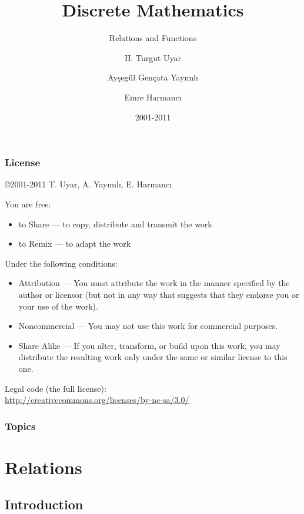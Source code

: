 \documentclass[dvipsnames]{beamer}
\title{Discrete Mathematics}
\subtitle{Relations and Functions}
\author{H. Turgut Uyar \and Ayşegül Gençata Yayımlı \and Emre Harmancı}
\date{2001-2011}
\begin{document}
\begin{frame}
  \titlepage
\end{frame}

\begin{frame}
  \frametitle{License}

  \hfill
  \copyright 2001-2011 T. Uyar, A. Yayımlı, E. Harmancı

  \vfill
  \begin{tiny}
    You are free:
    \begin{itemize}
      \item to Share — to copy, distribute and transmit the work
      \item to Remix — to adapt the work
    \end{itemize}

    Under the following conditions:
    \begin{itemize}
      \item Attribution — You must attribute the work in the manner specified by
        the author or licensor (but not in any way that suggests that they
        endorse you or your use of the work).

      \item Noncommercial — You may not use this work for commercial purposes.

      \item Share Alike — If you alter, transform, or build upon this work, you
        may distribute the resulting work only under the same or similar license
        to this one.
    \end{itemize}
  \end{tiny}

  \vfill
  Legal code (the full license):\\
  \url{http://creativecommons.org/licenses/by-nc-sa/3.0/}
\end{frame}

\begin{frame}
  \frametitle{Topics}
  \tableofcontents
\end{frame}

\section{Relations}

\subsection{Introduction}
\end{document}
